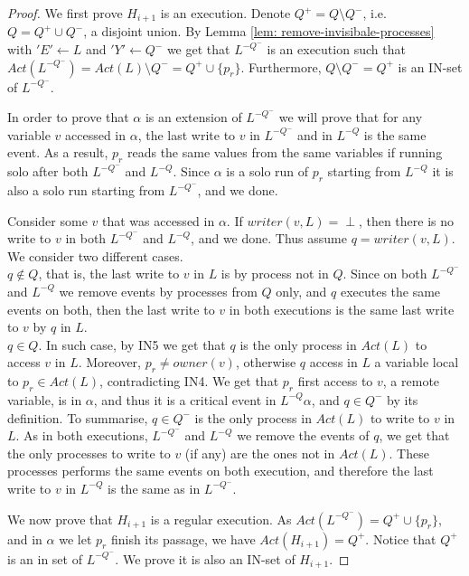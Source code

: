\begin{proof}
	We first prove $H_{i+1}$ is an execution. Denote $Q^+ = Q \setminus Q^-$, i.e. $Q = Q^+ \cup Q^-$, a disjoint union. By Lemma \ref{lem: remove-invisibale-processes} with $'E' \leftarrow L$ and $'Y' \leftarrow Q^-$ we get that $L^{-Q^-}$ is an execution such that $Act(L^{-Q^-}) = Act(L) \setminus Q^- = Q^+ \cup \{p_r\}$. Furthermore, $Q \setminus Q^- = Q^+$ is an IN-set of $L^{-Q^-}$.
	
	In order to prove that $\alpha$ is an extension of $L^{-Q^-}$ we will prove that for any variable $v$ accessed in $\alpha$, the last write to $v$ in $L^{-Q^-}$ and in $L^{-Q}$ is the same event. As a result, $p_r$ reads the same values from the same variables if running solo after both $L^{-Q^-}$ and $L^{-Q}$. Since $\alpha$ is a solo run of $p_r$ starting from $L^{-Q}$ it is also a solo run starting from $L^{-Q^-}$, and we done.
	
	Consider some $v$ that was accessed in $\alpha$. If $writer(v,L) = \perp$, then there is no write to $v$ in both $L^{-Q^-}$ and $L^{-Q}$, and we done. Thus assume $q = writer(v,L)$. We consider two different cases.
	\\ $q \notin Q$, that is, the last write to $v$ in $L$ is by process not in $Q$. Since on both $L^{-Q^-}$ and $L^{-Q}$ we remove events by processes from $Q$ only, and $q$ executes the same events on both, then the last write to $v$ in both executions is the same last write to $v$ by $q$ in $L$.
	\\ $q \in Q$. In such case, by IN5 we get that $q$ is the only process in $Act(L)$ to access $v$ in $L$. Moreover, $p_r \neq owner(v)$, otherwise $q$ access in $L$ a variable local to $p_r \in Act(L)$, contradicting IN4. We get that $p_r$ first access to $v$, a remote variable, is in $\alpha$, and thus it is a critical event in $L^{-Q} \alpha$, and $q \in Q^-$ by its definition.
	To summarise, $q \in Q^-$ is the only process in $Act(L)$ to write to $v$ in $L$. As in both executions, $L^{-Q^-}$ and $L^{-Q}$ we remove the events of $q$, we get that the only processes to write to $v$ (if any) are the ones not in $Act(L)$. These processes performs the same events on both execution, and therefore the last write to $v$ in $L^{-Q}$ is the same as in $L^{-Q^-}$.
	
	We now prove that $H_{i+1}$ is a regular execution. As $Act(L^{-Q^-}) = Q^+ \cup \{p_r\}$, and in $\alpha$ we let $p_r$ finish its passage, we have $Act(H_{i+1}) = Q^+$. Notice that $Q^+$ is an in set of $L^{-Q^-}$. We prove it is also an IN-set of $H_{i+1}$.
	

\end{proof}
